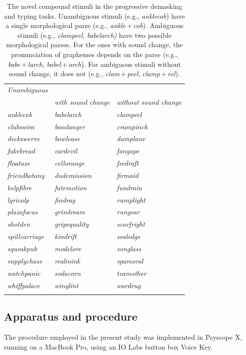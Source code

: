 \documentclass[output=paper]{langsci/langscibook}
\begin{document}
\begin{table}
\caption{\label{tab:libben:2}The novel compound stimuli in the progressive demasking and typing tasks.  Unambiguous stimuli (e.g., \textit{anklecob}) have a single morphological parse (e.g., \textit{ankle}\,+\,\textit{cob}). Ambiguous stimuli (e.g., \textit{clampeel,} \textit{babelarch)} have two possible morphological parses. For the ones with sound change, the pronunciation of graphemes depends on the parse (e.g., \textit{babe}\,+\,\textit{larch}, \textit{babel}\,+\,\textit{arch}).  For ambiguous stimuli without sound change, it does not (e.g., \textit{clam}\,+\,\textit{peel}, \textit{clamp}\,+\,\textit{eel}).}
\begin{tabular}{*{3}{>{\itshape}l}}
\lsptoprule
{\normalfont Unambiguous} & \multicolumn{2}{c}{{\normalfont Ambiguous}}\\\cmidrule(lr){2-3}
& {\normalfont with sound change} & {\normalfont without sound change}\\\midrule
anklecob & babelarch & clampeel\\
clubswim & bandanger & crampinch\\
deckswerve & bowlease & damplane\\
fakebread & cardevil & fangape\\
floataxe & cellorange & feedraft\\
friendbotany & dudemission & firmaid\\
kelpfibre & fatemotion & fundrain\\
lyricalp & findrag & rumplight\\
plazafocus & grindream & rungear\\
shotden & gripequality & scarfright\\
spillcarriage & kindrift & sealedge\\
squeakpub & modelore & songlass\\
supplychase & realmink & spamoral\\
watchpanic & sodacorn & teamother\\
whiffpalace & winglint & wardrug\\
\lspbottomrule
\end{tabular}
\end{table}

\subsection{Apparatus and procedure}\label{sec:libben:2.3}
The procedure employed in the present study was implemented in Psyscope X, running on a MacBook Pro, using an IO Labs button box Voice Key.  
\end{document}

